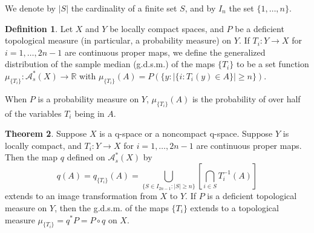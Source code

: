 \documentclass[sn-mathphys-num]{sn-jnl}%
\theoremstyle{thmstyleone}%
\theoremstyle{definition}
\newtheorem{theorem}{Theorem}%
\newtheorem{definition}[theorem]{Definition}
\begin{document}
We denote  by $|S|$ the cardinality of a finite set $S$, and by $I_n$ the set $ \{1, \dots, n\}$. 

\begin{definition}  \label{SampleMed}
Let $X$ and $Y$ be locally compact spaces, and $P$ be a deficient topological measure (in particular, a probability measure) on $Y$. 
If $T_i : Y \longrightarrow X$ for $i=1, \ldots, 2n-1$ 
are continuous proper maps, we define the generalized distribution of the sample median (g.d.s.m.) of the maps $ \{T_i\}$ to be a set function 
$ \mu_{\{T_i\}}: \mathscr{A}_{s}^{*}(X)  \longrightarrow \mathbb{R}$ with
$ \mu_{\{T_i\}}(A) = P(\{ y:  | \{i: T_i(y) \in A \}| \ge n\})$. 
\end{definition}

When $P$ is a probability measure on $Y$,  
$ \mu_{\{T_i\}}(A)$  is the probability of over half of the variables $T_i$ being in $A$. 

\begin{theorem} \label{SMedExt}
Suppose $X$ is a q-space or a noncompact q-space.
Suppose $Y$ is locally compact,  and $T_i : Y \longrightarrow X$ for $i=1, \ldots, 2n-1$ 
are continuous proper maps. Then the map $q$ defined on  $\mathscr{A}_{s}^{*}(X)$ by 
$$ q(A) = q_{\{T_i\}}(A) = \bigcup_{ \{S \in I_{2n-1}: |S| \ge n \} } \left[ \bigcap_{i \in S} T_i^{-1}(A) \right] $$
extends to an image transformation from $X$ to $Y$.
If $P$ is a deficient topological measure on $Y$,
then the  g.d.s.m. of the maps $ \{T_i\}$ 
extends to a topological measure $ \mu_{\{T_i\}} = q^*P = P \circ q$  on $X$.
\end{theorem}
\end{document}
